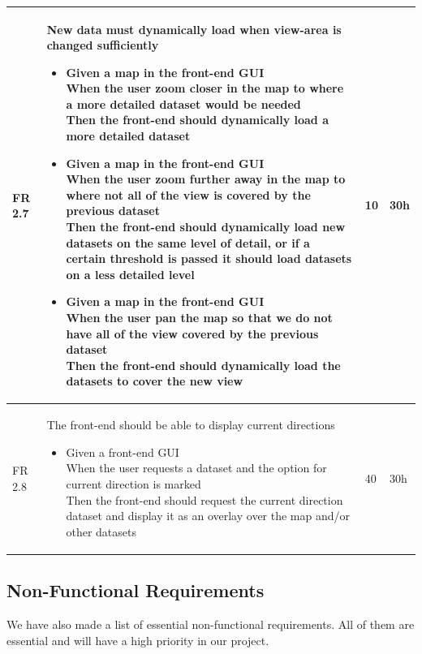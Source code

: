 \documentclass[11pt,a4paper,titlepage,oneside]{report}
\begin{document}
\begin{longtable}{p{1.4cm} p{7.8cm} p{1cm} p{1cm} }
  FR 2.7 & New data must dynamically load when view-area is changed sufficiently
  \begin{itemize}
  \item \parbox[t]{6.8cm}{
        Given a map in the front-end GUI \\
        When the user zoom closer in the map to where a more detailed dataset would be needed \\
        Then the front-end should dynamically load a more detailed dataset}
  \item \parbox[t]{6.8cm}{
        Given a map in the front-end GUI \\
        When the user zoom further away in the map to where not all of the view is covered by the previous dataset \\
        Then the front-end should dynamically load new datasets on the same level of detail, or if a certain threshold is passed it should load datasets on a less detailed level}
  \item \parbox[t]{6.8cm}{
        Given a map in the front-end GUI \\
        When the user pan the map so that we do not have all of the view covered by the previous dataset \\
        Then the front-end should dynamically load the datasets to cover the new view}
  \end{itemize}
  & 10 & 30h \\ \hline

  FR 2.8 & The front-end should be able to display current directions
  \begin{itemize}
  \item \parbox[t]{6.8cm}{
        Given a front-end GUI \\
        When the user requests a dataset and the option for current direction is marked \\
        Then the front-end should request the current direction dataset and display it as an overlay over the map and/or other datasets}
  \end{itemize}
  & 40 & 30h \\ \hline

  \end{longtable}

  \subsection{Non-Functional Requirements}
  We have also made a list of essential non-functional requirements. All of them are essential and will have a high priority in our project.
\end{document}
